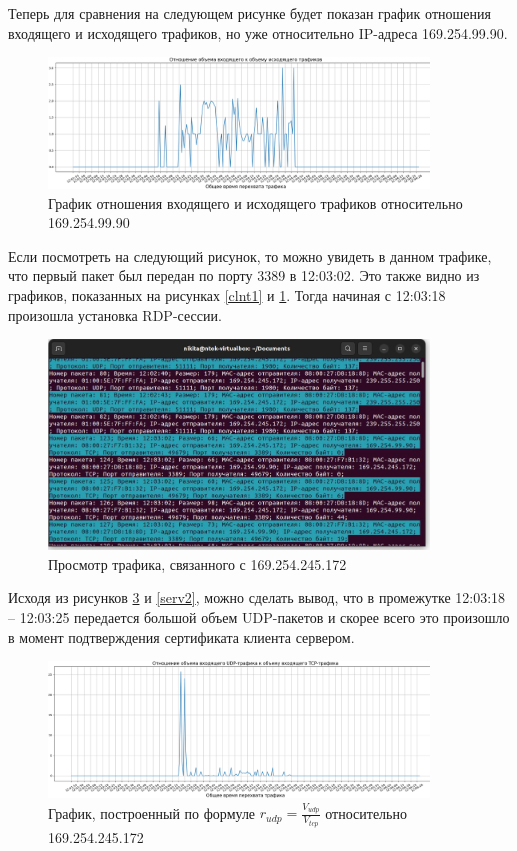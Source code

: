 \documentclass[bachelor, och, coursework]{SCWorks}
\begin{document}
  Теперь для сравнения на следующем рисунке будет показан график отношения входящего и исходящего трафиков, но уже относительно IP-адреса 169.254.99.90.

  \begin{figure}[H]
    \centering
    \includegraphics[width=0.9\textwidth]{photo/serv1.png}
    \caption{График отношения входящего и исходящего трафиков относительно 169.254.99.90}
    \label{serv1}
  \end{figure}

  Если посмотреть на следующий рисунок, то можно увидеть в данном трафике, что первый пакет был передан по порту 3389 в 12:03:02. Это также видно из
  графиков, показанных на рисунках \ref{clnt1} и \ref{serv1}. Тогда начиная с 12:03:18 произошла установка RDP-сессии.
  
  \begin{figure}[H]
    \centering
    \includegraphics[width=0.9\textwidth]{photo/traffic-1.jpg}
    \caption{Просмотр трафика, связанного с 169.254.245.172}
    \label{traf1}
  \end{figure}
  
  Исходя из рисунков \ref{clnt2} и \ref{serv2}, можно сделать вывод, что в промежутке 12:03:18 -- 12:03:25 передается большой объем UDP-пакетов и 
  скорее всего это произошло в момент подтверждения сертификата клиента сервером.

  \begin{figure}[H]
    \centering
    \includegraphics[width=0.9\textwidth]{photo/clnt2.png}
    \caption{График, построенный по формуле $r_{udp} = \frac{V_{udp}}{V_{tcp}}$ относительно 169.254.245.172}
    \label{clnt2}
  \end{figure}
\end{document}
